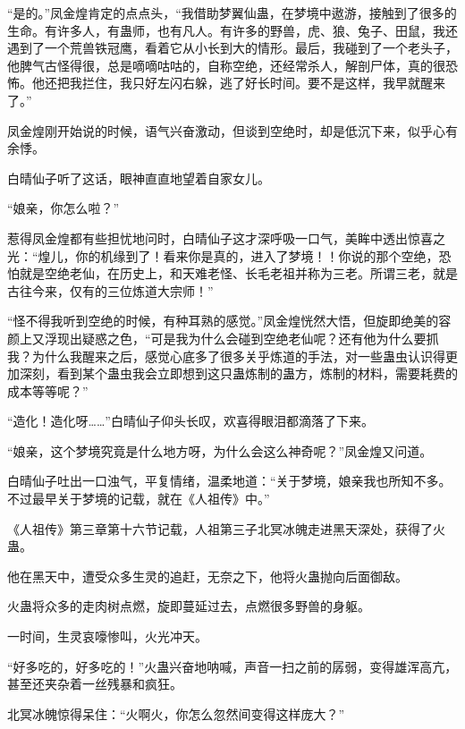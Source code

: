 
\begin{this_body}



“是的。”凤金煌肯定的点点头，“我借助梦翼仙蛊，在梦境中遨游，接触到了很多的生命。有许多人，有蛊师，也有凡人。有许多的野兽，虎、狼、兔子、田鼠，我还遇到了一个荒兽铁冠鹰，看着它从小长到大的情形。最后，我碰到了一个老头子，他脾气古怪得很，总是嘀嘀咕咕的，自称空绝，还经常杀人，解剖尸体，真的很恐怖。他还把我拦住，我只好左闪右躲，逃了好长时间。要不是这样，我早就醒来了。”

凤金煌刚开始说的时候，语气兴奋激动，但谈到空绝时，却是低沉下来，似乎心有余悸。

白晴仙子听了这话，眼神直直地望着自家女儿。

“娘亲，你怎么啦？”

惹得凤金煌都有些担忧地问时，白晴仙子这才深呼吸一口气，美眸中透出惊喜之光：“煌儿，你的机缘到了！看来你是真的，进入了梦境！！你说的那个空绝，恐怕就是空绝老仙，在历史上，和天难老怪、长毛老祖并称为三老。所谓三老，就是古往今来，仅有的三位炼道大宗师！”

“怪不得我听到空绝的时候，有种耳熟的感觉。”凤金煌恍然大悟，但旋即绝美的容颜上又浮现出疑惑之色，“可是我为什么会碰到空绝老仙呢？还有他为什么要抓我？为什么我醒来之后，感觉心底多了很多关乎炼道的手法，对一些蛊虫认识得更加深刻，看到某个蛊虫我会立即想到这只蛊炼制的蛊方，炼制的材料，需要耗费的成本等等呢？”

“造化！造化呀……”白晴仙子仰头长叹，欢喜得眼泪都滴落了下来。

“娘亲，这个梦境究竟是什么地方呀，为什么会这么神奇呢？”凤金煌又问道。

白晴仙子吐出一口浊气，平复情绪，温柔地道：“关于梦境，娘亲我也所知不多。不过最早关于梦境的记载，就在《人祖传》中。”

《人祖传》第三章第十六节记载，人祖第三子北冥冰魄走进黑天深处，获得了火蛊。

他在黑天中，遭受众多生灵的追赶，无奈之下，他将火蛊抛向后面御敌。

火蛊将众多的走肉树点燃，旋即蔓延过去，点燃很多野兽的身躯。

一时间，生灵哀嚎惨叫，火光冲天。

“好多吃的，好多吃的！”火蛊兴奋地呐喊，声音一扫之前的孱弱，变得雄浑高亢，甚至还夹杂着一丝残暴和疯狂。

北冥冰魄惊得呆住：“火啊火，你怎么忽然间变得这样庞大？”


\end{this_body}
